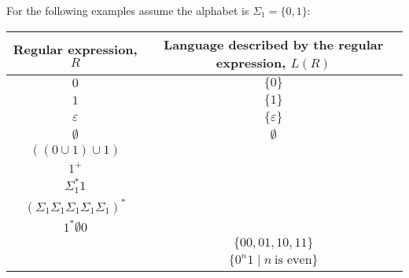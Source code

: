     
    For the following examples assume the alphabet is $\Sigma_1 =  \{0,1\}$:
    
    \begin{center}
    \renewcommand{\arraystretch}{1.5}
    \begin{tabular}{c|c}
    Regular expression, $R$ & Language described by the regular expression, $L(R)$\\
    \hline
    $0$ &$ \{ 0 \}$ \\
    $1$ & $\{ 1 \}$ \\
    $\varepsilon$ & $\{ \varepsilon  \}$ \\
    $\emptyset$ & $\emptyset$ \\
    $((0 \cup 1) \cup 1)$ & \\
    $1^+$ & \\
    $\Sigma_1^* 1$ & \\
    $(\Sigma_1 \Sigma_1 \Sigma_1 \Sigma_1 \Sigma_1)^*$ & \\
    $1^* \emptyset 0$ & \\
    & $\{00, 01, 10, 11\}$  \\
    & $\{ 0^n1 \mid n~\text{is even} \}$
    \end{tabular}
    \end{center}